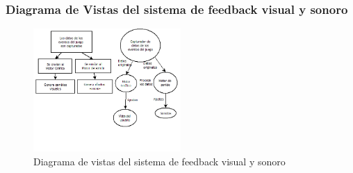 \subsubsection{Diagrama de Vistas del sistema de feedback visual y sonoro}

\begin{figure}[H]
    \centering
    \includegraphics[width=0.5\textwidth]{recursos/Imagenes/Diagrama2Feedback.png} 
    \caption{Diagrama de vistas del sistema de feedback visual y sonoro}
    \label{fig:mi_imagen}
\end{figure}